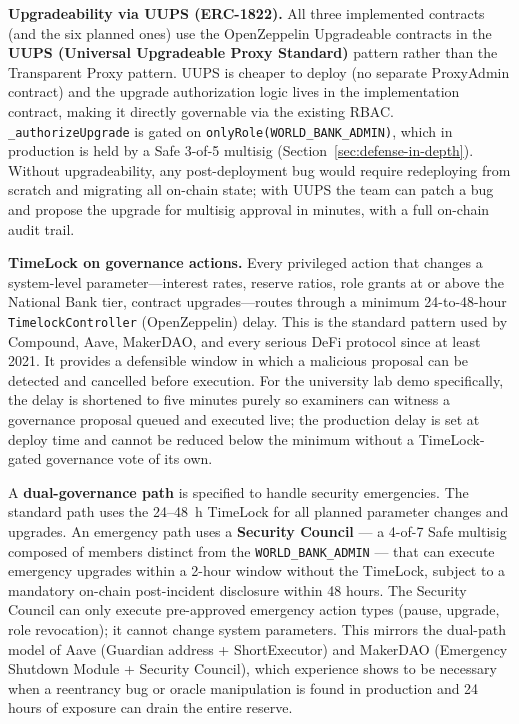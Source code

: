 \documentclass[12pt,a4paper]{report}
\begin{document}
\textbf{Upgradeability via UUPS (ERC-1822).} All three implemented contracts (and the six planned ones) use the OpenZeppelin Upgradeable contracts in the \textbf{UUPS (Universal Upgradeable Proxy Standard)} pattern rather than the Transparent Proxy pattern. UUPS is cheaper to deploy (no separate ProxyAdmin contract) and the upgrade authorization logic lives in the implementation contract, making it directly governable via the existing RBAC. \texttt{\_authorizeUpgrade} is gated on \texttt{onlyRole(WORLD\_BANK\_ADMIN)}, which in production is held by a Safe 3-of-5 multisig (Section~\ref{sec:defense-in-depth}). Without upgradeability, any post-deployment bug would require redeploying from scratch and migrating all on-chain state; with UUPS the team can patch a bug and propose the upgrade for multisig approval in minutes, with a full on-chain audit trail.

\textbf{TimeLock on governance actions.} Every privileged action that changes a system-level parameter---interest rates, reserve ratios, role grants at or above the National Bank tier, contract upgrades---routes through a minimum 24-to-48-hour \texttt{TimelockController} (OpenZeppelin) delay. This is the standard pattern used by Compound, Aave, MakerDAO, and every serious DeFi protocol since at least 2021. It provides a defensible window in which a malicious proposal can be detected and cancelled before execution. For the university lab demo specifically, the delay is shortened to five minutes purely so examiners can witness a governance proposal queued and executed live; the production delay is set at deploy time and cannot be reduced below the minimum without a TimeLock-gated governance vote of its own.

A \textbf{dual-governance path} is specified to handle security emergencies. The standard path uses the 24--48~h TimeLock for all planned parameter changes and upgrades. An emergency path uses a \textbf{Security Council} --- a 4-of-7 Safe multisig composed of members distinct from the \texttt{WORLD\_BANK\_ADMIN} --- that can execute emergency upgrades within a 2-hour window without the TimeLock, subject to a mandatory on-chain post-incident disclosure within 48 hours. The Security Council can only execute pre-approved emergency action types (pause, upgrade, role revocation); it cannot change system parameters. This mirrors the dual-path model of Aave (Guardian address + ShortExecutor) and MakerDAO (Emergency Shutdown Module + Security Council), which experience shows to be necessary when a reentrancy bug or oracle manipulation is found in production and 24 hours of exposure can drain the entire reserve.
\end{document}
